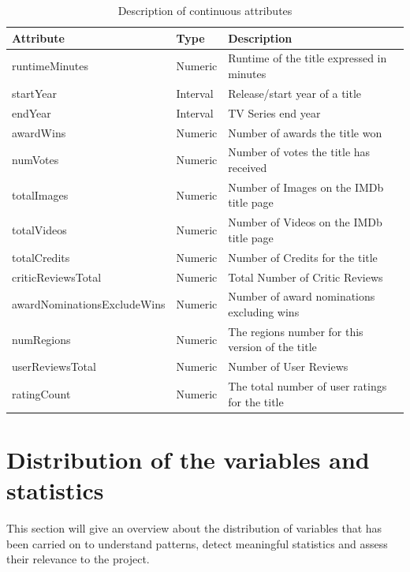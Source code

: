 \begin{table}[h]
    \centering
    \begin{tabular}{|l|l|l|} %
        \hline
        \textbf{Attribute} & \textbf{Type} & \textbf{Description} \\ 
        \hline
        runtimeMinutes & Numeric & Runtime of the title expressed in minutes \\ 
        \hline
        startYear & Interval & Release/start year of a title \\ 
        \hline
        endYear & Interval & TV Series end year \\
        \hline
        awardWins & Numeric & Number of awards the title won \\ 
        \hline
        numVotes & Numeric & Number of votes the title has received \\ 
        \hline
        totalImages & Numeric & Number of Images on the IMDb title page \\ 
        \hline
        totalVideos & Numeric & Number of Videos on the IMDb title page \\ 
        \hline
        totalCredits & Numeric & Number of Credits for the title \\ 
        \hline
        criticReviewsTotal & Numeric & Total Number of Critic Reviews \\ 
        \hline
        awardNominationsExcludeWins & Numeric & Number of award nominations excluding wins \\ 
        \hline
        numRegions & Numeric & The regions number for this version of the title \\ 
        \hline
        userReviewsTotal & Numeric & Number of User Reviews \\ 
        \hline
        ratingCount & Numeric & The total number of user ratings for the title \\ 
        \hline
    \end{tabular}
    \caption{Description of continuous attributes}
    \label{tab:numerical_attributes}
\end{table}
\section{Distribution of the variables and statistics}\label{sec:variable_distrib}
This section will give an overview about the distribution of variables that has been carried on to understand patterns, 
detect meaningful statistics and assess their relevance to the project. 

